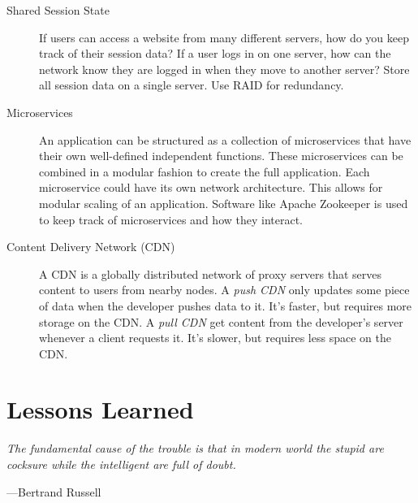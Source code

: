\begin{description}
	\item[Shared Session State] If users can access a website from many different servers, how do you keep track of their session data? If a user logs in on one server, how can the network know they are logged in when they move to another server? Store all session data on a single server. Use RAID for redundancy.
	
	\item[Microservices] An application can be structured as a collection of microservices that have their own well-defined independent functions. These microservices can be combined in a modular fashion to create the full application. Each microservice could have its own network architecture. This allows for modular scaling of an application. Software like Apache Zookeeper is used to keep track of microservices and how they interact.
	
	\item[Content Delivery Network (CDN)] A CDN is a globally distributed network of proxy servers that serves content to users from nearby nodes. A \textit{push CDN} only updates some piece of data when the developer pushes data to it. It's faster, but requires more storage on the CDN. A \textit{pull CDN} get content from the developer's server whenever a client requests it. It's slower, but requires less space on the CDN.
\end{description}

\newpage


\toclineskip
\section{Lessons Learned}


\vspace{4mm}
\begin{displayquote}
	\textit{The fundamental cause of the trouble is that in modern world the stupid are cocksure while the intelligent are full of doubt.}
	\begin{flushright}
		---Bertrand Russell
	\end{flushright}
\end{displayquote}
\vspace{4mm}


